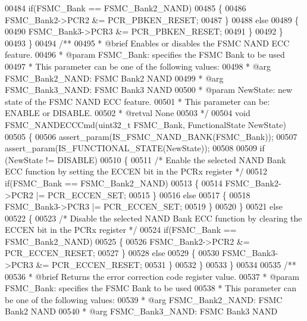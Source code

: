 \begin{DoxyCode}
00484     \textcolor{keywordflow}{if}(FSMC\_Bank == FSMC_Bank2_NAND)
00485     \{
00486       FSMC_Bank2->PCR2 &= PCR_PBKEN_RESET;
00487     \}
00488     \textcolor{keywordflow}{else}
00489     \{
00490       FSMC_Bank3->PCR3 &= PCR_PBKEN_RESET;
00491     \}
00492   \}
00493 \}
00494 \textcolor{comment}{/**}
00495 \textcolor{comment}{  * @brief  Enables or disables the FSMC NAND ECC feature.}
00496 \textcolor{comment}{  * @param  FSMC\_Bank: specifies the FSMC Bank to be used}
00497 \textcolor{comment}{  *          This parameter can be one of the following values:}
00498 \textcolor{comment}{  *            @arg FSMC\_Bank2\_NAND: FSMC Bank2 NAND }
00499 \textcolor{comment}{  *            @arg FSMC\_Bank3\_NAND: FSMC Bank3 NAND}
00500 \textcolor{comment}{  * @param  NewState: new state of the FSMC NAND ECC feature.  }
00501 \textcolor{comment}{  *          This parameter can be: ENABLE or DISABLE.}
00502 \textcolor{comment}{  * @retval None}
00503 \textcolor{comment}{  */}
00504 \textcolor{keywordtype}{void} FSMC_NANDECCCmd(uint32\_t FSMC\_Bank, FunctionalState NewState)
00505 \{
00506   assert_param(IS\_FSMC\_NAND\_BANK(FSMC\_Bank));
00507   assert_param(IS\_FUNCTIONAL\_STATE(NewState));
00508 
00509   \textcolor{keywordflow}{if} (NewState != DISABLE)
00510   \{
00511     \textcolor{comment}{/* Enable the selected NAND Bank ECC function by setting the ECCEN bit in the PCRx register */}
00512     \textcolor{keywordflow}{if}(FSMC\_Bank == FSMC_Bank2_NAND)
00513     \{
00514       FSMC_Bank2->PCR2 |= PCR_ECCEN_SET;
00515     \}
00516     \textcolor{keywordflow}{else}
00517     \{
00518       FSMC_Bank3->PCR3 |= PCR_ECCEN_SET;
00519     \}
00520   \}
00521   \textcolor{keywordflow}{else}
00522   \{
00523     \textcolor{comment}{/* Disable the selected NAND Bank ECC function by clearing the ECCEN bit in the PCRx register */}
00524     \textcolor{keywordflow}{if}(FSMC\_Bank == FSMC_Bank2_NAND)
00525     \{
00526       FSMC_Bank2->PCR2 &= PCR_ECCEN_RESET;
00527     \}
00528     \textcolor{keywordflow}{else}
00529     \{
00530       FSMC_Bank3->PCR3 &= PCR_ECCEN_RESET;
00531     \}
00532   \}
00533 \}
00534 
00535 \textcolor{comment}{/**}
00536 \textcolor{comment}{  * @brief  Returns the error correction code register value.}
00537 \textcolor{comment}{  * @param  FSMC\_Bank: specifies the FSMC Bank to be used}
00538 \textcolor{comment}{  *          This parameter can be one of the following values:}
00539 \textcolor{comment}{  *            @arg FSMC\_Bank2\_NAND: FSMC Bank2 NAND }
00540 \textcolor{comment}{  *            @arg FSMC\_Bank3\_NAND: FSMC Bank3 NAND}

\end{DoxyCode}
